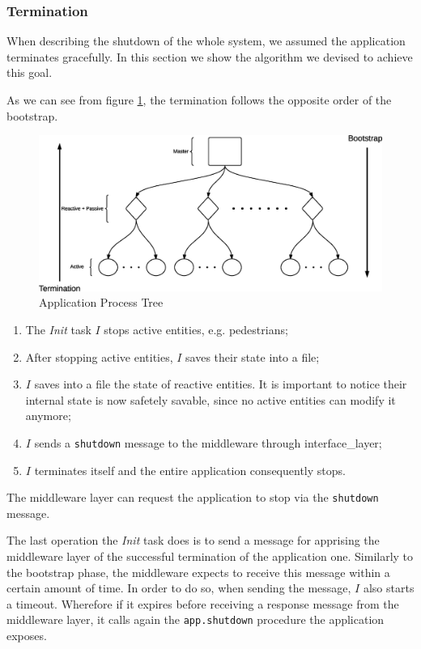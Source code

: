 \subsubsection{Termination}

When describing the shutdown of the whole system, we assumed the application
terminates gracefully.
In this section we show the algorithm we devised to achieve this goal.

As we can see from figure \ref{fig:app-proc-tree}, the termination follows the
opposite order of the bootstrap.

\begin{figure}[H]
  \centering
  \includegraphics[scale=0.4,keepaspectratio]
    {images/solution/app_proc_tree.eps}
  \caption{Application Process Tree}
  \label{fig:app-proc-tree}
\end{figure}

\begin{enumerate}
  \item The \textit{Init} task $I$ stops active entities, e.g. pedestrians;
  \item After stopping active entities, $I$ saves their state into a file;
  \item $I$ saves into a file the state of reactive entities.
  It is important to notice their internal state is now safetely savable,
  since no active entities can modify it anymore;
  \item $I$ sends a \texttt{shutdown} message to the middleware through
  interface\_layer;
  \item $I$ terminates itself and the entire application consequently stops.
\end{enumerate}

The middleware layer can request the application to stop via the
\texttt{shutdown} message.

The last operation the \textit{Init} task does is to send a message for apprising
the middleware layer of the successful termination of the application one.
Similarly to the bootstrap phase, the middleware expects to receive this
message within a certain amount of time.
In order to do so, when sending the message, $I$ also starts a timeout.
Wherefore if it expires before receiving a response message from the middleware layer,
it calls again the \texttt{app.shutdown} procedure the application exposes.
